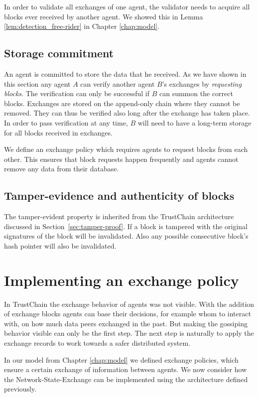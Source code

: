 In order to validate all exchanges of one agent, the validator needs to acquire all blocks ever 
received by another agent. We showed this in Lemma \ref{lem:detection_free-rider} in Chapter \ref{chap:model}.

\subsection{Storage commitment}
An agent is committed to store the data that he received. As we have shown in this section any agent
$A$ can verify another agent $B$'s exchanges by \textit{requesting blocks}. The verification can 
only be successful if $B$ can 
summon the correct blocks. Exchanges are stored on the append-only chain where they cannot be 
removed. They can thus be verified also long after the exchange has taken place. In order to pass
verification at any time, $B$ will need to have a long-term storage for all blocks received in 
exchanges.

We define an exchange policy which requires agents to request blocks from each other. This ensures 
that block requests happen frequently and agents cannot remove any data from their database.

\subsection{Tamper-evidence and authenticity of blocks}
The tamper-evident property is inherited from the TrustChain architecture discussed in 
Section~\ref{sec:tamper-proof}. If a block is tampered with the original signatures of the block 
will be invalidated. Also any possible consecutive block's hash pointer will also be invalidated.

\section{Implementing an exchange policy}
In TrustChain the exchange behavior of agents was not visible. With the addition of exchange blocks
agents can base their decisions, for example whom to interact with, on how much data 
peers exchanged in the past. But making the gossiping behavior visible can only be the first step. 
The next step is naturally to apply the exchange records to work towards a safer distributed system.

In our model from Chapter \ref{chap:model} we defined exchange policies, which 
ensure a certain exchange of information between agents. We now consider how the
Network-State-Exchange can be implemented using the architecture defined previously. 

